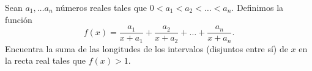 Sean $a_1,\dots a_n$ números reales tales que $0\lt a_1\lt a_2\lt\dots\lt a_n$. Definimos la función
\[f(x)=\frac{a_1}{x+a_1}+\frac{a_2}{x+a_2}+\dots+\frac{a_n}{x+a_n}.\]
Encuentra la suma de las longitudes de los intervalos (disjuntos entre sí) de $x$ en la recta real tales que $f(x)>1$.
